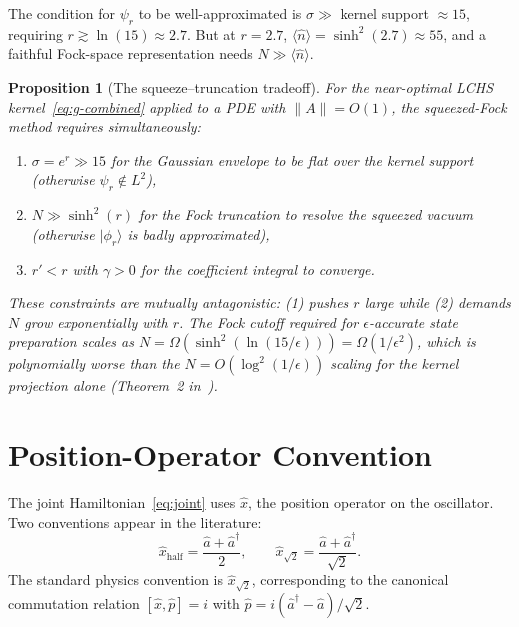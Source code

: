 \documentclass[11pt]{article}
\newtheorem{proposition}{Proposition}
\begin{document}
The condition for $\psi_r$ to be well-approximated is
$\sigma \gg$ kernel support $\approx 15$, requiring $r \gtrsim \ln(15) \approx 2.7$.
But at $r = 2.7$, $\langle\hat{n}\rangle = \sinh^2(2.7) \approx 55$, and a faithful
Fock-space representation needs $N \gg \langle\hat{n}\rangle$.

\begin{proposition}[The squeeze--truncation tradeoff]
For the near-optimal LCHS kernel~\eqref{eq:g-combined} applied to a PDE with
$\|A\| = O(1)$, the squeezed-Fock method requires simultaneously:
\begin{enumerate}[itemsep=2pt]
  \item $\sigma = e^r \gg 15$ for the Gaussian envelope to be flat over the
        kernel support (otherwise $\psi_r \notin L^2$),
  \item $N \gg \sinh^2(r)$ for the Fock truncation to resolve the squeezed
        vacuum (otherwise $|\phi_r\rangle$ is badly approximated),
  \item $r' < r$ with $\gamma > 0$ for the coefficient integral to converge.
\end{enumerate}
These constraints are mutually antagonistic: (1) pushes $r$ large while (2)
demands $N$ grow exponentially with $r$.  The Fock cutoff required for
$\epsilon$-accurate state preparation scales as
$N = \Omega(\sinh^2(\ln(15/\epsilon))) = \Omega(1/\epsilon^2)$,
which is polynomially worse than the $N = O(\log^2(1/\epsilon))$ scaling
for the kernel projection alone (Theorem~2 in~\cite{das2025}).
\end{proposition}

\section{Position-Operator Convention}\label{sec:convention}

The joint Hamiltonian~\eqref{eq:joint} uses $\hat{x}$, the position operator
on the oscillator.  Two conventions appear in the literature:
\begin{equation}\label{eq:conventions}
  \hat{x}_{\text{half}} = \frac{\hat{a}+\hat{a}^\dagger}{2},
  \qquad
  \hat{x}_{\sqrt{2}} = \frac{\hat{a}+\hat{a}^\dagger}{\sqrt{2}}.
\end{equation}
The standard physics convention is $\hat{x}_{\sqrt{2}}$, corresponding to the
canonical commutation relation $[\hat{x},\hat{p}] = i$ with
$\hat{p} = i(\hat{a}^\dagger - \hat{a})/\sqrt{2}$.
\end{document}
